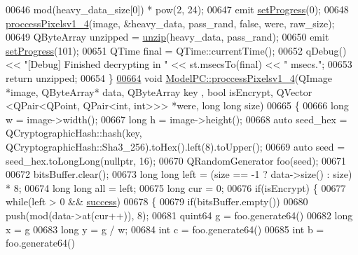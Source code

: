 \begin{DoxyCode}
00646             mod(heavy\_data\_size[0]) * pow(2, 24);
00647     emit \hyperlink{class_model_p_c_afdcd80f0ed5062e145a71f09b0897547}{setProgress}(0);
00648     \hyperlink{class_model_p_c_a5cdb4d1d61ff62ee9d45b496a7dbf1fb}{proccessPixelsv1\_4}(image, &heavy\_data, pass\_rand, \textcolor{keyword}{false}, were, raw\_size);
00649     QByteArray unzipped = \hyperlink{class_model_p_c_a6da88f166785a49f73b22c169f956fd0}{unzip}(heavy\_data, pass\_rand);
00650     emit \hyperlink{class_model_p_c_afdcd80f0ed5062e145a71f09b0897547}{setProgress}(101);
00651     QTime \textcolor{keyword}{final} = QTime::currentTime();
00652     qDebug() << \textcolor{stringliteral}{"[Debug] Finished decrypting in "} << st.msecsTo(\textcolor{keyword}{final}) << \textcolor{stringliteral}{" msecs."};
00653     \textcolor{keywordflow}{return} unzipped;
00654 \}
\hypertarget{modelpc_8cpp_source.tex_l00664}{}\hyperlink{class_model_p_c_a5cdb4d1d61ff62ee9d45b496a7dbf1fb}{00664} \textcolor{keywordtype}{void} \hyperlink{class_model_p_c_a5cdb4d1d61ff62ee9d45b496a7dbf1fb}{ModelPC::proccessPixelsv1\_4}(QImage *image, QByteArray* data, QByteArray key
      , \textcolor{keywordtype}{bool} isEncrypt, QVector <QPair<QPoint, QPair<int, int>>> *were, \textcolor{keywordtype}{long} \textcolor{keywordtype}{long} size)
00665 \{
00666     \textcolor{keywordtype}{long} w = image->width();
00667     \textcolor{keywordtype}{long} h = image->height();
00668     \textcolor{keyword}{auto} seed\_hex = QCryptographicHash::hash(key, QCryptographicHash::Sha3\_256).toHex().left(8).toUpper();
00669     \textcolor{keyword}{auto} seed = seed\_hex.toLongLong(\textcolor{keyword}{nullptr}, 16);
00670     QRandomGenerator foo(seed);
00671 
00672     bitsBuffer.clear();
00673     \textcolor{keywordtype}{long} \textcolor{keywordtype}{long} left = (size == -1 ? data->size() : size) * 8;
00674     \textcolor{keywordtype}{long} \textcolor{keywordtype}{long} all = left;
00675     \textcolor{keywordtype}{long} cur = 0;
00676     \textcolor{keywordflow}{if}(isEncrypt) \{
00677         \textcolor{keywordflow}{while}(left > 0 && \hyperlink{class_model_p_c_a945ffbbc44a832b953c191debd448f4c}{success})
00678         \{
00679             \textcolor{keywordflow}{if}(bitsBuffer.empty())
00680                 push(mod(data->at(cur++)), 8);
00681             quint64 g = foo.generate64() %
00682             \textcolor{keywordtype}{long} x = g %
00683             \textcolor{keywordtype}{long} y = g / w;
00684             \textcolor{keywordtype}{int} c = foo.generate64() %
00685             \textcolor{keywordtype}{int} b = foo.generate64() %

\end{DoxyCode}
